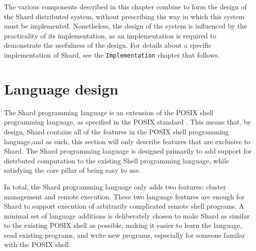 \documentclass[twoside]{report}
\begin{document}
The various components described in this chapter combine to form the design of the Shard distributed system, without prescribing the way in which this system must be implemented.
Nonetheless, the design of the system is influenced by the practicality of its implementation, as an implementation is required to demonstrate the usefulness of the design.
For details about a specific implementation of Shard, see the \texttt{Implementation} chapter that follows.

\section{Language design}


The Shard programming language is an extension of the POSIX shell programming language, as specified in the POSIX standard \cite{posix2017}.
This means that, by design, Shard contains all of the features in the POSIX shell programming language,and as such, this section will only describe features that are exclusive to Shard.
The Shard programming language is designed primarily to add support for distrbuted computation to the existing Shell programming language, while satisfying the core pillar of being easy to use.

In total, the Shard programming language only adds two features: cluster management and remote execution.
These two language features are enough for Shard to support execution of arbitrarily complicated remote shell programs.
A minimal set of language additions is deliberately chosen to make Shard as similar to the existing POSIX shell as possible, making it easier to learn the language, read existing programs, and write new programs, especially for someone familar with the POSIX shell.
\end{document}
